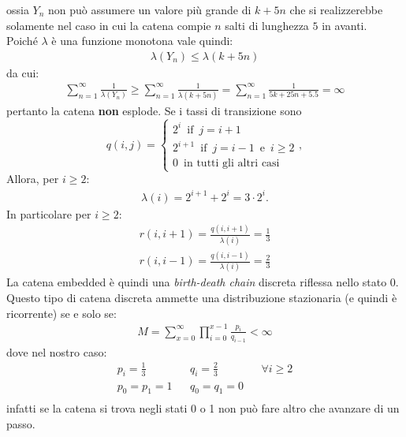 \documentclass[11pt,largemargins]{homework}
\begin{document}
\begin{alphaparts}
ossia \(Y_n\) non può assumere un valore più grande di \(k+5n\) che si realizzerebbe solamente nel caso in cui la catena compie \(n\) salti di lunghezza \(5\) in avanti.
\\
Poiché \(\lambda\) è una funzione monotona vale quindi:
\begin{gather*}
  \lambda(Y_n) \leq \lambda(k+5n)
\end{gather*}
da cui:
\begin{gather*}
   \sum \limits_{n=1}^{\infty} \frac{1}{\lambda(Y_n)} \geq  \sum \limits_{n=1}^{\infty} \frac{1}{\lambda(k+5n)}=
    \sum \limits_{n=1}^{\infty} \frac{1}{5k + 25n + 5.5} = \infty
\end{gather*}
pertanto la catena \textbf{non} esplode.
  \questionpart
  Se i tassi di transizione sono
  \begin{equation*}
  q\left(i,j\right)=\begin{cases}2^{i} \,\,\,\text{if}\,\,\,j=i+1\\2^{i+1} \,\,\,\text{if}\,\,\,j=i-1\,\,\,\text{e}\,\,\,i\geq 2\\0 \,\,\, \text{in tutti gli altri casi}\end{cases},
  \end{equation*}
  Allora, per \(i \geq 2\):
  \begin{gather*}
    \lambda(i) = 2^{i+1} + 2^i = 3 \cdot 2^i.
  \end{gather*}
  In particolare per \(i\geq 2\):
  \begin{gather*}
    r(i,i+1) = \frac{q(i, i+1)}{\lambda(i)} = \frac{1}{3}\\
    r(i,i-1) = \frac{q(i, i-1)}{\lambda(i)} = \frac{2}{3}
  \end{gather*}
  La catena embedded è quindi una \textit{birth-death chain} discreta riflessa nello stato 0. Questo tipo di catena discreta ammette una distribuzione stazionaria (e quindi è ricorrente) se e solo se:
  \begin{gather*}
    M =  \sum \limits_{x=0}^{\infty} \prod\limits_{i=0}^{x-1} \frac{p_i}{q_{i-1}} < \infty
  \end{gather*} 
  dove nel nostro caso:
  \begin{align*}
    p_i = \frac{1}{3} && q_i = \frac{2}{3} && \forall i \geq 2 \\
    p_0 = p_1 = 1 && q_0 = q_1 = 0\\
  \end{align*}
  infatti se la catena si trova negli stati 0 o 1 non può fare altro che avanzare di un passo.
  \\

\end{alphaparts}
\end{document}
